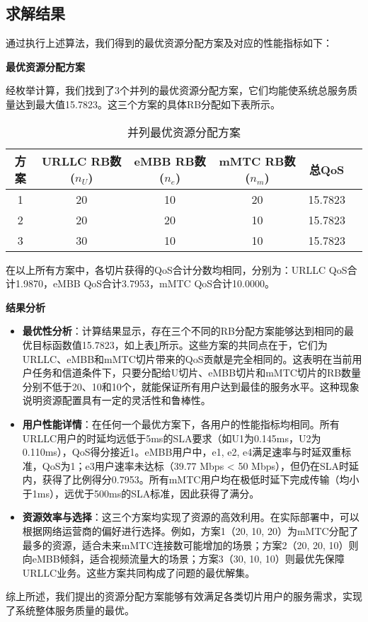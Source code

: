 \subsection{求解结果}
通过执行上述算法，我们得到的最优资源分配方案及对应的性能指标如下：

\textbf{最优资源分配方案}

经枚举计算，我们找到了3个并列的最优资源分配方案，它们均能使系统总服务质量达到最大值15.7823。这三个方案的具体RB分配如下表所示。

\begin{table}[H]
\centering
\caption{并列最优资源分配方案}
\label{tab:q1_best_solutions}
\begin{tabular}{cccccc}
\hline
\textbf{方案} & \textbf{URLLC RB数 ($n_U$)} & \textbf{eMBB RB数 ($n_e$)} & \textbf{mMTC RB数 ($n_m$)} & \textbf{总QoS} \\
\hline
1 & 20 & 10 & 20 & 15.7823 \\
2 & 20 & 20 & 10 & 15.7823 \\
3 & 30 & 10 & 10 & 15.7823 \\
\hline
\end{tabular}
\end{table}

在以上所有方案中，各切片获得的QoS合计分数均相同，分别为：URLLC QoS合计1.9870，eMBB QoS合计3.7953，mMTC QoS合计10.0000。

\textbf{结果分析}

\begin{itemize}
    \item \textbf{最优性分析}：计算结果显示，存在三个不同的RB分配方案能够达到相同的最优目标函数值15.7823，如上表\ref{tab:q1_best_solutions}所示。这些方案的共同点在于，它们为URLLC、eMBB和mMTC切片带来的QoS贡献是完全相同的。这表明在当前用户任务和信道条件下，只要分配给U切片、eMBB切片和mMTC切片的RB数量分别不低于20、10和10个，就能保证所有用户达到最佳的服务水平。这种现象说明资源配置具有一定的灵活性和鲁棒性。
    \item \textbf{用户性能详情}：在任何一个最优方案下，各用户的性能指标均相同。所有URLLC用户的时延均远低于5ms的SLA要求（如U1为0.145ms，U2为0.110ms），QoS得分接近1。eMBB用户中，e1, e2, e4满足速率与时延双重标准，QoS为1；e3用户速率未达标（39.77 Mbps < 50 Mbps），但仍在SLA时延内，获得了比例得分0.7953。所有mMTC用户均在极低时延下完成传输（均小于1ms），远优于500ms的SLA标准，因此获得了满分。
    \item \textbf{资源效率与选择}：这三个方案均实现了资源的高效利用。在实际部署中，可以根据网络运营商的偏好进行选择。例如，方案1（20, 10, 20）为mMTC分配了最多的资源，适合未来mMTC连接数可能增加的场景；方案2（20, 20, 10）则向eMBB倾斜，适合视频流量大的场景；方案3（30, 10, 10）则最优先保障URLLC业务。这些方案共同构成了问题的最优解集。
\end{itemize}

综上所述，我们提出的资源分配方案能够有效满足各类切片用户的服务需求，实现了系统整体服务质量的最优。